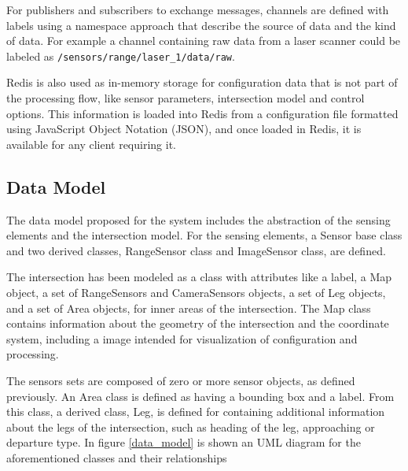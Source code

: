 For publishers and subscribers to exchange messages, channels are defined with labels using a namespace approach that describe the source of data and the kind of data. For example a channel containing raw data from a laser scanner could be labeled as \texttt{/sensors/range/laser\_1/data/raw}.

Redis is also used as in-memory storage for configuration data that is not part of the processing flow, like sensor parameters, intersection model and control options. This information is loaded into Redis from a configuration file formatted using JavaScript Object Notation (JSON), and once loaded in Redis, it is available for any client requiring it.


\subsection{Data Model}

The data model proposed for the system includes the abstraction of the sensing elements and the intersection model. For the sensing elements, a Sensor base class and two derived classes, RangeSensor class and ImageSensor class, are defined. 

The intersection has been modeled as a class with attributes like a label, a Map object, a set of RangeSensors and CameraSensors objects, a set of Leg objects, and a set of Area objects, for inner areas of the intersection. The Map class contains information about the geometry of the intersection and the coordinate system, including a image intended for visualization of configuration and processing.

The sensors sets are composed of zero or more sensor objects, as defined previously. An Area class is defined as having a bounding box and a label. From this class, a derived class, Leg, is defined for containing additional information about the legs of the intersection, such as heading of the leg, approaching or departure type. In figure \ref{data_model} is shown an UML diagram for the aforementioned classes and their relationships

